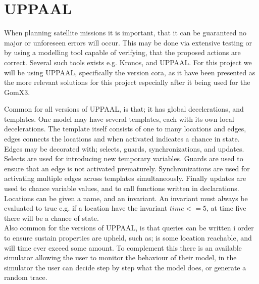 \section{UPPAAL}
When planning satellite missions it is important, that it can be guaranteed no major or unforeseen errors will occur. This may be done via extensive testing or by using a modelling tool capable of verifying, that the proposed actions are correct\cite{cs_smc}. Several such tools exists e.g. Kronos, and UPPAAL. For this project we will be using UPPAAL, specifically the version \gls{cora}, as it have been presented as the more relevant solutions for this project especially after it being used for the GomX3\cite{gomx3}.

Common for all versions of UPPAAL, is that; it has global decelerations, and templates. One model may have several templates, each with its own local decelerations. The template itself consists of one to many locations and edges, edges connects the locations and when activated indicates a chance in state.\\
Edges may be decorated with; selects, guards, synchronizations, and updates. Selects are used for introducing new temporary variables. Guards are used to ensure that an edge is not activated prematurely. Synchronizations are used for activating multiple edges across templates simultaneously. Finally updates are used to chance variable values, and to call functions written in declarations.\\
Locations can be given a name, and an invariant. An invariant must always be evaluated to true e.g. if a location have the invariant $time <= 5$, at time five there will be a chance of state.\\
Also common for the versions of UPPAAL, is that queries can be written i order to ensure sustain properties are upheld, such as; is some location reachable, and will time ever exceed some amount. To complement this there is an available simulator allowing the user to monitor the behaviour of their model, in the simulator the user can decide step by step what the model does, or generate a random trace.


